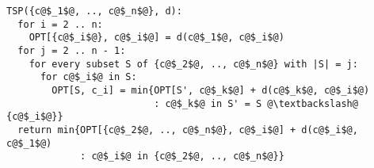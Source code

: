 \begin{verbatim}
TSP({c@$_1$@, .., c@$_n$@}, d):
  for i = 2 .. n:
    OPT[{c@$_i$@}, c@$_i$@] = d(c@$_1$@, c@$_i$@)
  for j = 2 .. n - 1:
    for every subset S of {c@$_2$@, .., c@$_n$@} with |S| = j:
      for c@$_i$@ in S:
        OPT[S, c_i] = min{OPT[S', c@$_k$@] + d(c@$_k$@, c@$_i$@)
                          : c@$_k$@ in S' = S @\textbackslash@ {c@$_i$@}}
  return min{OPT[{c@$_2$@, .., c@$_n$@}, c@$_i$@] + d(c@$_i$@, c@$_1$@)
             : c@$_i$@ in {c@$_2$@, .., c@$_n$@}}
\end{verbatim}

